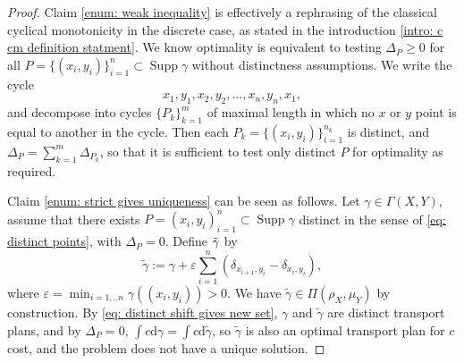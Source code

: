 \documentclass[11pt, oneside, titlepage]{book}
\theoremstyle{plain}
\theoremstyle{definition}
\newcommand{\di}{\mathrm{d}}
\DeclareMathOperator{\supp}{Supp}
\begin{document}
\begin{proof}
    Claim \ref{enum: weak inequality} is effectively a rephrasing of the classical cyclical monotonicity in the discrete case, as stated in the introduction \eqref{intro: c cm definition statment}. We know optimality is equivalent to testing $\Delta_P \geq 0$ for all $P=\{(x_i, y_i)\}_{i=1}^n \subset \supp \gamma$ without distinctness assumptions. We write the cycle
    \begin{equation*}
        x_1, y_1, x_2, y_2, ..., x_n, y_n, x_1,
    \end{equation*}
    and decompose into cycles $\{P_k\}_{k=1}^m$ of maximal length in which no $x$ or $y$ point is equal to another in the cycle. Then each $P_k = \{(x_i, y_i)\}_{i=1}^{n_k}$  is distinct, and $\Delta_P = \sum_{k=1}^m \Delta_{P_k}$, so that it is sufficient to test only distinct $P$ for optimality as required.

    Claim \ref{enum: strict gives uniqueness} can be seen as follows. Let $\gamma \in \Gamma(X, Y)$, assume that there exists $P = (x_i, y_i)_{i=1}^n \subset \supp \gamma$ distinct in the sense of \eqref{eq: distinct points}, with $\Delta_P = 0$. Define $\Tilde{\gamma}$ by
    \begin{equation*}
        \tilde\gamma := \gamma + \varepsilon \sum_{i=1}^n \left(\delta_{x_{i+1}, y_i} - \delta_{x_i, y_i}\right),
    \end{equation*}
    where $\varepsilon = \min_{i=1,..n} \gamma((x_i, y_i)) >0$. We have $\tilde\gamma \in \Pi(\rho_X, \mu_Y)$ by construction. By \eqref{eq: distinct shift gives new set}, $\gamma$ and $\tilde \gamma$ are distinct transport plans, and by $\Delta_P = 0$, $\int c \di \gamma = \int c \di \tilde\gamma$, so $\tilde \gamma$ is also an optimal transport plan for $c$ cost, and the problem does not have a unique solution.


\end{proof}
\end{document}
